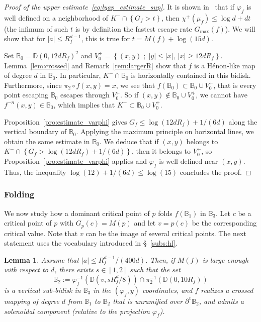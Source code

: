 \documentclass[oneside, 12pt]{amsart}
\newcommand{\disk}{\mathbb{D}}
\newcommand{\fr}{\partial}
\newcommand{\set}[1]{\left\{#1\right\}}
\newcommand{\abs}[1]{\left\vert#1\right\vert}
\newcommand{\inv}{^{-1}}
\newcommand{\bb}{\mathbb{B}}
\theoremstyle{plain}
\newtheorem{lem}[thm]{Lemma}
\theoremstyle{definition}
\numberwithin{equation}{section}       %
\numberwithin{equation}{section}       %
\begin{document}
 \begin{proof}[Proof of the upper estimate~\eqref{eq:lyap_estimate_sup}]
 It is shown in~\cite[Thm A.2]{lyapunov} that if $\varphi_f$ is well defined on a neighborhood of $K^-\cap \set{G_f>t}$, then $\chi^+(\mu_f)\leq   \log d +  dt$ (the infimum of such $t$ is by definition the fastest escape rate $G_{\mathrm{max}}(f)$). 
 We will show that for $\abs{a}\leq R_f^{d-1}$, this is true for  $t= M(f)+\log(15d)$. 
 
Set $\bb_0=\disk(0, 12dR_f)^2$ and $V_0^+ = \set{(x,y)\; ; \;  \abs{y}\leq \abs{x}, \ \abs{x}\geq 12dR_f}$. 
Lemma~\ref{lem:crossed} and Remark~\ref{rem:largerR} 
show that $f$ is a Hénon-like map of degree $d$ in $\bb_0$. 
In particular, $K^-\cap \bb_0$ is horizontally contained in this bidisk.  Furthermore, since 
$\pi_2\circ f(x,y) = x$, we see that $f(\bb_0)\subset \bb_0\cup V_0^+$, that is 
every point escaping $\bb_0$ escapes through $V_0^+$. 
So if $(x,y)\notin \bb_0\cup V_0^+$, we cannot have $f^{-n}(x,y)\in \bb_0$, which 
  implies that $K^-\subset  \bb_0\cup V_0^+$. 

Proposition~\ref{pro:estimate_varphi} gives $G_f\leq \log(12dR_f)+1/(6d)$
 along the vertical boundary of $\bb_0$. 
Applying the maximum principle on horizontal lines, we obtain the same estimate in $\bb_0$. 
We deduce that if $(x,y)$ belongs to  
 $K^- \cap \set{G_f> \log(12dR_f)+1/(6d)}$, then 
 it belongs to $V_0^+$, so 
 Proposition~\ref{pro:estimate_varphi} applies and $\varphi_f$ is well defined near $(x,y)$.  
 Thus, the inequality $\log(12)+1/(6d)\leq \log (15)$ concludes the proof. 
\end{proof}



\subsubsection{Folding}
\label{subsub:folding}
We now study how a dominant critical point of $p$  folds $f(\bb_1)$ in $\bb_3$.  
Let $c$ be a critical point of $p$ with $G_p(c) =M(p)$ and let $v= p(c)$ be the corresponding critical value. 
Note that $v$ can be the image of several critical points. 
The next statement uses the vocabulary introduced in \S~\ref{subs:hl}. 

\begin{lem}
\label{lem:folding}
Assume that $\abs{a}\leq     R_f^{d-1}/(400d)$. 
Then, if $M(f)$ is large enough with respect to $d$, there exists $s\in [1, 2]$ such 
that  the set 
\[
\bb_2:= \varphi_f\inv (\disk(v, sR_f^d/8)) \cap \pi_2\inv (\disk(0, 10 R_f))
\] 
is a vertical sub-bidisk
in $\bb_3$  in 
the $(\varphi_f, y)$ coordinates, 
and $f$ realizes a crossed mapping of degree $d$ from $\bb_1$ to $\bb_2$ that is unramified over $\fr^v\bb_2$, and admits a solenoidal component 
 (relative to the projection $\varphi_f$).   
\end{lem}
\end{document}
